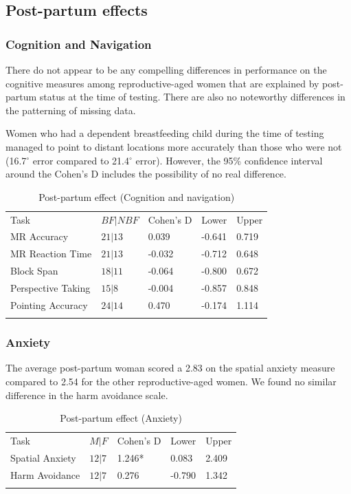 	\subsection{Post-partum effects}
	\label{sec:3.3}
		\subsubsection{Cognition and Navigation}
		\label{sec:3.3.1}
There do not appear to be any compelling differences in performance on the cognitive measures among reproductive-aged women that are explained by post-partum status at the time of testing.  There are also no noteworthy differences in the patterning of missing data.

Women who had a dependent breastfeeding child during the time of testing managed to point to distant locations more accurately than those who were not (16.7$^{\circ}$ error compared to 21.4$^{\circ}$ error). However, the 95\% confidence interval around the Cohen's D includes the possibility of no real difference.

\begin{table}[h!]
\caption{Post-partum effect (Cognition and navigation)}
\label{tab:bf_cog}  
\begin{tabular}{lllll}
\hline\noalign{\smallskip}
Task & $BF|NBF$ & Cohen's D & Lower & Upper  \\
\noalign{\smallskip}\hline\noalign{\smallskip}
MR Accuracy & $21|13$ & \phantom{-}0.039 & -0.641 & 0.719 \\
MR Reaction Time & $21|13$ & -0.032 & -0.712 & 0.648 \\
Block Span & $18|11$ & -0.064 & -0.800 & 0.672\\
Perspective Taking & $15|8$ & -0.004 & -0.857 & 0.848 \\
Pointing Accuracy & $24|14$ & \phantom{-}0.470 & -0.174 & 1.114 \\
\noalign{\smallskip}\hline
\end{tabular}
\end{table}

		\subsubsection{Anxiety}
		\label{sec:3.3.2}
The average post-partum woman scored a 2.83 on the spatial anxiety measure compared to 2.54 for the other reproductive-aged women.  We found no similar difference in the harm avoidance scale.

\begin{table}[h!]
\caption{Post-partum effect (Anxiety)}
\label{tab:bf_anx}  
\begin{tabular}{lllll}
\hline\noalign{\smallskip}
Task & $M|F$ & Cohen's D & Lower & Upper  \\
\noalign{\smallskip}\hline\noalign{\smallskip}
Spatial Anxiety & $12|7$ & 1.246* & \phantom{-}0.083 & 2.409 \\
Harm Avoidance & $12|7$ & 0.276 & -0.790 & 1.342 \\
\noalign{\smallskip}\hline
\end{tabular}
\end{table}

